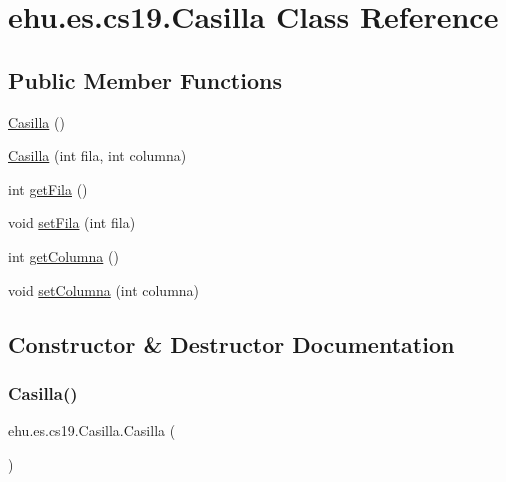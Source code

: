 \hypertarget{classehu_1_1es_1_1cs19_1_1_casilla}{}\section{ehu.\+es.\+cs19.\+Casilla Class Reference}
\label{classehu_1_1es_1_1cs19_1_1_casilla}
\subsection*{Public Member Functions}
\begin{DoxyCompactItemize}
\item 
\mbox{\hyperlink{classehu_1_1es_1_1cs19_1_1_casilla_a9ae836c754917c83dac201fb84cc9f6f}{Casilla}} ()
\item 
\mbox{\hyperlink{classehu_1_1es_1_1cs19_1_1_casilla_a761c470ab35ee804989241b22a0daf31}{Casilla}} (int fila, int columna)
\item 
int \mbox{\hyperlink{classehu_1_1es_1_1cs19_1_1_casilla_a3bbee61d6ea5e8c7ae49f3214245888d}{get\+Fila}} ()
\item 
void \mbox{\hyperlink{classehu_1_1es_1_1cs19_1_1_casilla_ad7bc4a453c5edfef3c7c227c50eb433e}{set\+Fila}} (int fila)
\item 
int \mbox{\hyperlink{classehu_1_1es_1_1cs19_1_1_casilla_a79fbd222c9ed3d7b1577f1f590fe528e}{get\+Columna}} ()
\item 
void \mbox{\hyperlink{classehu_1_1es_1_1cs19_1_1_casilla_a6fd764d3538340e21c46b0e0c49cfc7b}{set\+Columna}} (int columna)
\end{DoxyCompactItemize}


\subsection{Constructor \& Destructor Documentation}
\mbox{\label{classehu_1_1es_1_1cs19_1_1_casilla_a9ae836c754917c83dac201fb84cc9f6f}} 
\subsubsection{\texorpdfstring{Casilla()}{Casilla()}\hspace{0.1cm}{\footnotesize\ttfamily [1/2]}}
{\footnotesize\ttfamily ehu.\+es.\+cs19.\+Casilla.\+Casilla (\begin{DoxyParamCaption}{ }\end{DoxyParamCaption})}


